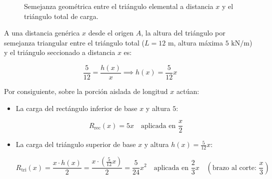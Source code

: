 \begin{figure}[H]
{%

    }

    \caption{Semejanza geométrica entre el triángulo elemental a distancia $x$ y el triángulo total de carga.}

    \label{fig:ejemplo4_semejanza}

\end{figure}



A una distancia genérica $x$ desde el origen $A$, la altura del triángulo por semejanza triangular entre el triángulo total ($L=12\text{ m}$, altura máxima $5\text{ kN/m}$) y el triángulo seccionado a distancia $x$ es:

\begin{equation}

    \frac{5}{12} = \frac{h(x)}{x} \implies \boxed{h(x) = \frac{5}{12}x}

\end{equation}



Por consiguiente, sobre la porción aislada de longitud $x$ actúan:

\begin{itemize}

    \item La carga del rectángulo inferior de base $x$ y altura $5$:

          \[

              R_{\text{rec}}(x) = 5x \quad \text{aplicada en } \frac{x}{2}

          \]

    \item La carga del triángulo superior de base $x$ y altura $h(x) = \frac{5}{12}x$:

          \[

              R_{\text{tri}}(x) = \frac{x \cdot h(x)}{2} = \frac{x \cdot \left(\frac{5}{12}x\right)}{2} = \frac{5}{24}x^2 \quad \text{aplicada en } \frac{2}{3}x \quad \left(\text{brazo al corte: } \frac{x}{3}\right)

          \]

\end{itemize}



